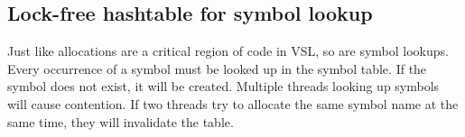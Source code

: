 







\subsection{Lock-free hashtable for symbol lookup}
\label{sec:hashtable}
Just like allocations are a critical region of code in VSL, so are symbol lookups.
Every occurrence of a symbol must be looked up in the symbol table. If the symbol does
not exist, it will be created. Multiple threads looking up symbols will cause contention.
If two threads try to allocate the same symbol name at the same time, they will invalidate
the table.

